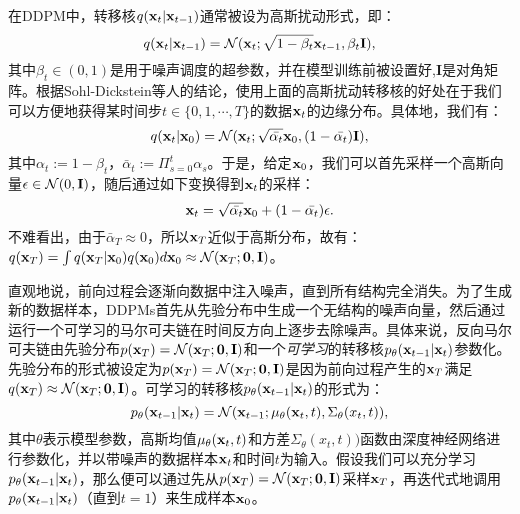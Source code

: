 \documentclass[11pt,a4paper,UTF8]{ctexart}
\begin{document}
在DDPM中，转移核$q(\mathbf{x}_t|\mathbf{x}_{t-1})$通常被设为高斯扰动形式，即：
\begin{equation*}
    q(\mathbf{x}_t|\mathbf{x}_{t-1}) =\mathcal{N}(\mathbf{x}_t;\sqrt{1-\beta_t}\mathbf{x}_{t-1},\beta_t\mathbf{I}),
\end{equation*}
其中$\beta_t\in(0,1)$是用于噪声调度的超参数，并在模型训练前被设置好,$\mathbf{I}$是对角矩阵。根据Sohl-Dickstein等人\cite{sohldickstein2015diffusion}的结论，使用上面的高斯扰动转移核的好处在于我们可以方便地获得某时间步$t\in\{0,1,\cdots,T\}$的数据$\mathbf{x}_t$的边缘分布。具体地，我们有：
\begin{equation*}
    q(\mathbf{x}_t|\mathbf{x}_0)=\mathcal{N}(\mathbf{x}_t;\sqrt{\bar{\alpha_t}}\mathbf{x}_0,(1-\bar{\alpha_t})\mathbf{I}),
\end{equation*}
其中$\alpha_t:=1-\beta_t$，$\bar{\alpha}_t:=\Pi_{s=0}^t\alpha_s$。于是，给定$\mathbf{x}_0$，我们可以首先采样一个高斯向量$\epsilon\in\mathcal{N}(0,\mathbf{I})$，随后通过如下变换得到$\mathbf{x}_t$的采样：
\begin{equation*}
    \mathbf{x}_t=\sqrt{\bar{\alpha_t}}\mathbf{x}_0 + (1-\bar{\alpha_t})\epsilon.
\end{equation*}
不难看出，由于$\bar{\alpha}_T\approx 0$，所以$\mathbf{x}_T$近似于高斯分布，故有：$q(\mathbf{x}_T)=\int q(\mathbf{x}_T|\mathbf{x}_0)q(\mathbf{x}_0)d\mathbf{x}_0\approx \mathcal{N}(\mathbf{x}_T;\mathbf{0},\mathbf{I})$。

直观地说，前向过程会逐渐向数据中注入噪声，直到所有结构完全消失。为了生成新的数据样本，DDPMs首先从先验分布中生成一个无结构的噪声向量，然后通过运行一个可学习的马尔可夫链在时间反方向上逐步去除噪声。具体来说，反向马尔可夫链由先验分布$p(\mathbf{x}_T)=\mathcal{N}(\mathbf{x}_T;\mathbf{0},\mathbf{I})$和一个\emph{可学习}的转移核$p_{\theta}(\mathbf{x}_{t-1}|\mathbf{x}_t)$参数化。先验分布的形式被设定为$p(\mathbf{x}_T)=\mathcal{N}(\mathbf{x}_T;\mathbf{0},\mathbf{I})$是因为前向过程产生的$\mathbf{x}_T$满足$q(\mathbf{x}_T)\approx \mathcal{N}(\mathbf{x}_T;\mathbf{0},\mathbf{I})$。可学习的转移核$p_{\theta}(\mathbf{x}_{t-1}|\mathbf{x}_t)$的形式为：
\begin{equation*}
    p_{\theta}(\mathbf{x}_{t-1}|\mathbf{x}_t) = \mathcal{N}(\mathbf{x}_{t-1};\mu_{\theta}(\mathbf{x}_t,t),\Sigma_{\theta}(x_t,t)),
\end{equation*}
其中$\theta$表示模型参数，高斯均值$\mu_{\theta}(\mathbf{x}_t,t)$和方差$\Sigma_{\theta}(x_t,t))$函数由深度神经网络进行参数化，并以带噪声的数据样本$\mathbf{x}_t$和时间$t$为输入。假设我们可以充分学习$p_{\theta}(\mathbf{x}_{t-1}|\mathbf{x}_t)$，那么便可以通过先从$p(\mathbf{x}_T)=\mathcal{N}(\mathbf{x}_T;\mathbf{0},\mathbf{I})$采样$\mathbf{x}_T$，再迭代式地调用$p_{\theta}(\mathbf{x}_{t-1}|\mathbf{x}_t)$（直到$t=1$）来生成样本$\mathbf{x}_0$。
\end{document}
